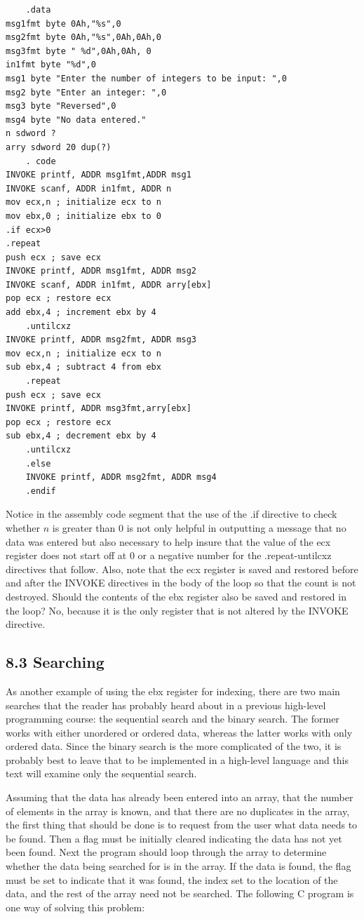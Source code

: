 \documentclass[10pt]{book}
\begin{document}
\begin{verbatim}
    .data
msg1fmt byte 0Ah,"%s",0
msg2fmt byte 0Ah,"%s",0Ah,0Ah,0
msg3fmt byte " %d",0Ah,0Ah, 0
in1fmt byte "%d",0
msg1 byte "Enter the number of integers to be input: ",0
msg2 byte "Enter an integer: ",0
msg3 byte "Reversed",0
msg4 byte "No data entered."
n sdword ?
arry sdword 20 dup(?)
    . code
INVOKE printf, ADDR msg1fmt,ADDR msg1
INVOKE scanf, ADDR in1fmt, ADDR n
mov ecx,n ; initialize ecx to n
mov ebx,0 ; initialize ebx to 0
.if ecx>0
.repeat
push ecx ; save ecx
INVOKE printf, ADDR msg1fmt, ADDR msg2
INVOKE scanf, ADDR in1fmt, ADDR arry[ebx]
pop ecx ; restore ecx
add ebx,4 ; increment ebx by 4
    .untilcxz
INVOKE printf, ADDR msg2fmt, ADDR msg3
mov ecx,n ; initialize ecx to n
sub ebx,4 ; subtract 4 from ebx
    .repeat
push ecx ; save ecx
INVOKE printf, ADDR msg3fmt,arry[ebx]
pop ecx ; restore ecx
sub ebx,4 ; decrement ebx by 4
    .untilcxz
    .else
    INVOKE printf, ADDR msg2fmt, ADDR msg4
    .endif
\end{verbatim}

Notice in the assembly code segment that the use of the .if directive to check whether $n$ is greater than 0 is not only helpful in outputting a message that no data was entered but also necessary to help insure that the value of the ecx register does not start off at 0 or a negative number for the .repeat-untilcxz directives that follow. Also, note that the ecx register is saved and restored before and after the INVOKE directives in the body of the loop so that the count is not destroyed. Should the contents of the ebx register also be saved and restored in the loop? No, because it is the only register that is not altered by the INVOKE directive.

\subsection*{8.3 Searching}
As another example of using the ebx register for indexing, there are two main searches that the reader has probably heard about in a previous high-level programming course: the sequential search and the binary search. The former works with either unordered or ordered data, whereas the latter works with only ordered data. Since the binary search is the more complicated of the two, it is probably best to leave that to be implemented in a high-level language and this text will examine only the sequential search.


Assuming that the data has already been entered into an array, that the number of elements in the array is known, and that there are no duplicates in the array, the first thing that should be done is to request from the user what data needs to be found. Then a flag must be initially cleared indicating the data has not yet been found. Next the program should loop through the array to determine whether the data being searched for is in the array. If the data is found, the flag must be set to indicate that it was found, the index set to the location of the data, and the rest of the array need not be searched. The following C program is one way of solving this problem:
\end{document}
